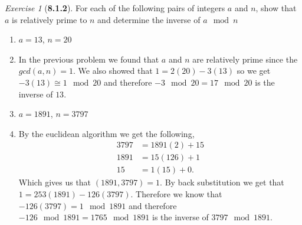 \documentclass[12pt]{amsart}
\makeatletter
\theoremstyle{remark}
\newtheorem*{exercise}{Exercise}%
\renewenvironment{proof}[1][\proofname]{\par\doublespacing
  \pushQED{\qed}%
  \normalfont \topsep6\p@\@plus6\p@\relax
  \list{}{%
    \settowidth{\leftmargin}{\itshape\proofname:\hskip\labelsep}%
    \setlength{\labelwidth}{0pt}%
    \setlength{\itemindent}{-\leftmargin}%
  }%
  \item[\hskip\labelsep\itshape#1\@addpunct{:}]\ignorespaces
}{%
  \popQED\endlist\@endpefalse
  \singlespacing
}
\theoremstyle{mycomment}
\makeatother
\begin{document}
\begin{exercise}[\textbf{8.1.2}] For each of the following pairs of integers $a$ and $n$, show that $a$ is relatively prime
  to $n$ and determine the inverse of $a  \mod  n$
  \begin{enumerate}
    \item[a.] $a = 13$, $n = 20$
    \begin{proof} In the previous problem we found that $a$ and $n$ are relatively prime since the $gcd(a, n) = 1$. We also showed that 
      $1 = 2(20) - 3(13)$ so we get $-3(13) \cong 1  \mod  20$ and therefore $-3  \mod  20 = 17  \mod  20$ is the inverse of $13$. 
      \end{proof}
    \vspace{.15in}

    \item[c.] $a = 1891$, $n = 3797$ 
    \begin{proof} By the euclidean algorithm we get the following, 
      \begin{align*}
        3797 &= 1891(2) + 15\\
        1891 &= 15(126) + 1\\
        15 &= 1(15) + 0.
      \end{align*}
      Which gives us that $(1891,3797) = 1$. By back substitution we get that $ 1 = 253(1891) - 126(3797)$. Therefore 
      we know that $-126(3797) = 1  \mod  1891$ and therefore $-126  \mod  1891 = 1765  \mod  1891$ is the inverse of $3797  \mod  1891$. 
      \end{proof}

  \end{enumerate}
\end{exercise}
\vspace{.5in}
\end{document}
